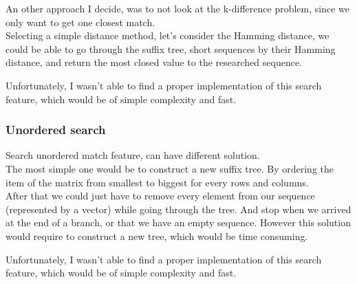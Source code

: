 \par
An other approach I decide, was to not look at the k-difference problem, since we only want to get one closest match.\\
Selecting a simple distance method, let's consider the Hamming distance, we could be able to go through the suffix tree,
short sequences by their Hamming distance, and return the most closed value to the researched sequence.\\

\par
Unfortunately, I wasn't able to find a proper implementation of this search feature, which would be of simple complexity and fast.
\bigskip

\subsubsection{Unordered search}
\par
Search unordered match feature, can have different solution.\\
The most simple one would be to construct a new suffix tree. By ordering the item of the matrix from smallest to biggest for every rows and columns.\\
After that we could just have to remove every element from our sequence (represented by a vector) while going through the tree.
And stop when we arrived at the end of a branch, or that we have an empty sequence. However this solution would require to construct a new tree, which would be
time consuming.\\

\par
Unfortunately, I wasn't able to find a proper implementation of this search feature, which would be of simple complexity and fast.
\bigskip
